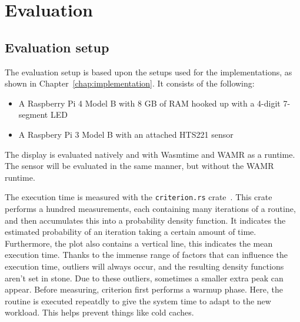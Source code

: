 \chapter{Evaluation}
\label{chap:evaluation}




\section{Evaluation setup}

The evaluation setup is based upon the setups used for the implementations, as shown in Chapter~\ref{chap:implementation}. It consists of the following:

\begin{itemize}
  \item A Raspberry Pi 4 Model B with 8 GB of RAM hooked up with a 4-digit 7-segment LED
  \item A Raspbery Pi 3 Model B with an attached HTS221 sensor
\end{itemize}

The display is evaluated natively and with Wasmtime and \gls{WAMR} as a runtime. The sensor will be evaluated in the same manner, but without the WAMR runtime.

The execution time is measured with the \texttt{criterion.rs} crate~\cite{gh:criterion}. This crate performs a hundred measurements, each containing many iterations of a routine, and then accumulates this into a probability density function. It indicates the estimated probability of an iteration taking a certain amount of time. Furthermore, the plot also contains a vertical line, this indicates the mean execution time. Thanks to the immense range of factors that can influence the execution time, outliers will always occur, and the resulting density functions aren't set in stone. Due to these outliers, sometimes a smaller extra peak can appear. Before measuring, criterion first performs a warmup phase. Here, the routine is executed repeatdly to give the system time to adapt to the new workload. This helps prevent things like cold caches.

